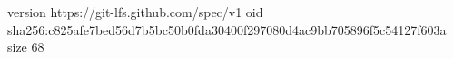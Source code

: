 version https://git-lfs.github.com/spec/v1
oid sha256:c825afe7bed56d7b5bc50b0fda30400f297080d4ac9bb705896f5c54127f603a
size 68
